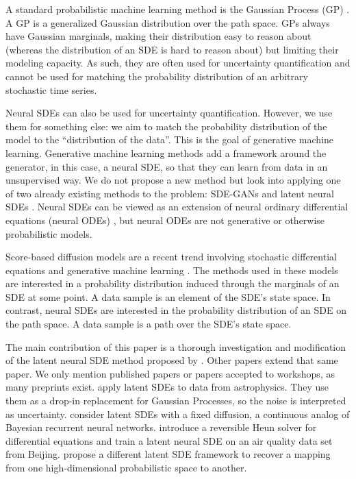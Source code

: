 \documentclass[twoside,11pt]{article}
\begin{document}
A standard probabilistic machine learning method is the Gaussian Process (GP) \citep{williams2006gaussian}. A GP is a generalized Gaussian distribution over the path space. GPs always have Gaussian marginals, making their distribution easy to reason about (whereas the distribution of an SDE is hard to reason about) but limiting their modeling capacity. As such, they are often used for uncertainty quantification and cannot be used for matching the probability distribution of an arbitrary stochastic time series.

Neural SDEs can also be used for uncertainty quantification. However, we use them for something else: we aim to match the probability distribution of the model to the \enquote{distribution of the data}. This is the goal of generative machine learning. Generative machine learning methods add a framework around the generator, in this case, a neural SDE, so that they can learn from data in an unsupervised way. We do not propose a new method but look into applying one of two already existing methods to the problem: SDE-GANs \citep{kidgergan} and latent neural SDEs \citep{li2020scalable}. Neural SDEs can be viewed as an extension of neural ordinary differential equations (neural ODEs) \citep{chen2018neural}, but neural ODEs are not generative or otherwise probabilistic models.

Score-based diffusion models are a recent trend involving stochastic differential equations and generative machine learning \citep{song2020score}. The methods used in these models are interested in a probability distribution induced through the marginals of an SDE at some point. A data sample is an element of the SDE's state space. In contrast, neural SDEs are interested in the probability distribution of an SDE on the path space. A data sample is a path over the SDE's state space.

The main contribution of this paper is a thorough investigation and modification of the latent neural SDE method proposed by \cite{li2020scalable}. Other papers extend that same paper. We only mention published papers or papers accepted to workshops, as many preprints exist. \cite{fagin2023latent} apply latent SDEs to data from astrophysics. They use them as a drop-in replacement for Gaussian Processes, so the noise is interpreted as uncertainty. \cite{xu} consider latent SDEs with a fixed diffusion, a continuous analog of Bayesian recurrent neural networks. \cite{kidgerefficient} introduce a reversible Heun solver for differential equations and train a latent neural SDE on an air quality data set from Beijing. \cite{hasan2021identifying} propose a different latent SDE framework to recover a mapping from one high-dimensional probabilistic space to another.
\end{document}
